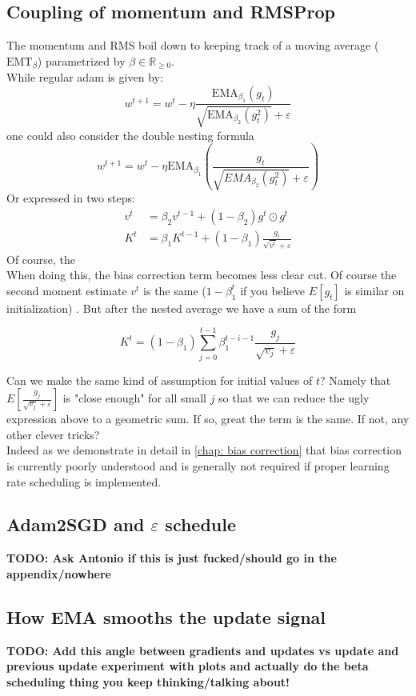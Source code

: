 \documentclass[12pt]{book}
\newcommand{\R}{\mathbb{R}}
\newcommand{\todo}[1]{{\color{red}\bf{TODO: #1}}}
\begin{document}
\subsection*{Coupling of momentum and RMSProp}
The momentum and RMS boil down to keeping track of a moving average ($\text{EMT}_{\beta}$) parametrized by $\beta\in \R_{\ge 0}$. 
\\
While regular adam is given by:
\[
w^{t+1} = w^{t} - \eta \frac{\text{EMA}_{\beta_1}(g_t)}{\sqrt{\text{EMA}_{\beta_2}(g_t ^2) } + \varepsilon  }
\] 
one could also consider the double nesting formula
\[
w^{t+1} = w^{t} - \eta \text{EMA}_{\beta_1} \left( \frac{g_t}{\sqrt{EMA_{\beta_2}(g_t^2)} + \varepsilon  } \right) 
\] 
Or expressed in two steps:
\begin{align*}
	v^{t} &= \beta_2v^{t-1} + (1-\beta_2)g^{t}\odot g^{t}\\
	K^{t} &= \beta_1K^{t-1} + (1-\beta_1) \frac{g_{t}}{\sqrt{v^{t}} + \varepsilon  }
\end{align*}
Of course, the \\
When doing this, the bias correction term becomes less clear cut. Of course the second moment estimate $v^{t}$ is the same ($1-\beta_1^{t} $ if you believe $E[g_t]$ is similar on initialization) . But after the nested average we have a sum of the form 

\[
	K^{t} = (1-\beta_1)\sum_{j=0}^{t-1} {\beta_1^{t-i-1} \frac{g_j}{\sqrt{v_j} + \varepsilon }}
\]

Can we make the same kind of assumption for initial values of $t$? Namely that $E[\frac{g_j}{\sqrt{v_j} + \varepsilon }]$ is "close enough" for all small $j$ so that we can reduce the ugly expression above to a geometric sum. If so, great the term is the same. If not, any other clever tricks? 
\\
Indeed as we demonstrate in detail in \ref{chap: bias correction} that bias correction is currently poorly understood and is generally not required if proper learning rate scheduling is implemented. 

\subsection{Adam2SGD and $\varepsilon $ schedule}
\todo{Ask Antonio if this is just fucked/should go in the appendix/nowhere}
\subsection{How EMA smooths the update signal}
\todo{Add this angle between gradients and updates vs update and previous update experiment with plots and actually do the beta scheduling thing you keep thinking/talking about!}
\end{document}
